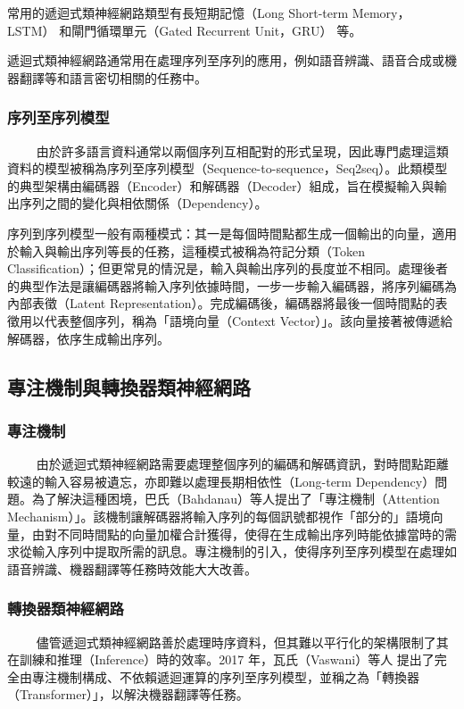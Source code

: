 常用的遞迴式類神經網路類型有長短期記憶（Long Short-term Memory，LSTM）\cite{hochreiter1997long} 和閘門循環單元（Gated Recurrent Unit，GRU）\cite{cho-etal-2014-properties} 等。

遞迴式類神經網路通常用在處理序列至序列的應用，例如語音辨識、語音合成或機器翻譯等和語言密切相關的任務中。

\subsubsection{序列至序列模型}
　　
由於許多語言資料通常以兩個序列互相配對的形式呈現，因此專門處理這類資料的模型被稱為序列至序列模型（Sequence-to-sequence，Seq2seq）\cite{sutskever2014sequence}。此類模型的典型架構由編碼器（Encoder）和解碼器（Decoder）組成，旨在模擬輸入與輸出序列之間的變化與相依關係（Dependency）。

序列到序列模型一般有兩種模式：其一是每個時間點都生成一個輸出的向量，適用於輸入與輸出序列等長的任務，這種模式被稱為符記分類（Token Classification）；但更常見的情況是，輸入與輸出序列的長度並不相同。處理後者的典型作法是讓編碼器將輸入序列依據時間，一步一步輸入編碼器，將序列編碼為內部表徵（Latent Representation）。完成編碼後，編碼器將最後一個時間點的表徵用以代表整個序列，稱為「語境向量（Context Vector）」。該向量接著被傳遞給解碼器，依序生成輸出序列。

\subsection{專注機制與轉換器類神經網路}

\subsubsection{專注機制}
　　
由於遞迴式類神經網路需要處理整個序列的編碼和解碼資訊，對時間點距離較遠的輸入容易被遺忘，亦即難以處理長期相依性（Long-term Dependency）問題。為了解決這種困境，巴氏（Bahdanau）等人提出了「專注機制（Attention Mechanism）」\cite{bahdanau2014neural}。該機制讓解碼器將輸入序列的每個訊號都視作「部分的」語境向量，由對不同時間點的向量加權合計獲得，使得在生成輸出序列時能依據當時的需求從輸入序列中提取所需的訊息。專注機制的引入，使得序列至序列模型在處理如語音辨識、機器翻譯等任務時效能大大改善。

\subsubsection{轉換器類神經網路}
　　
儘管遞迴式類神經網路善於處理時序資料，但其難以平行化的架構限制了其在訓練和推理（Inference）時的效率。2017 年，瓦氏（Vaswani）等人 \cite{vaswani2017attention} 提出了完全由專注機制構成、不依賴遞迴運算的序列至序列模型，並稱之為「轉換器（Transformer）」，以解決機器翻譯等任務。

